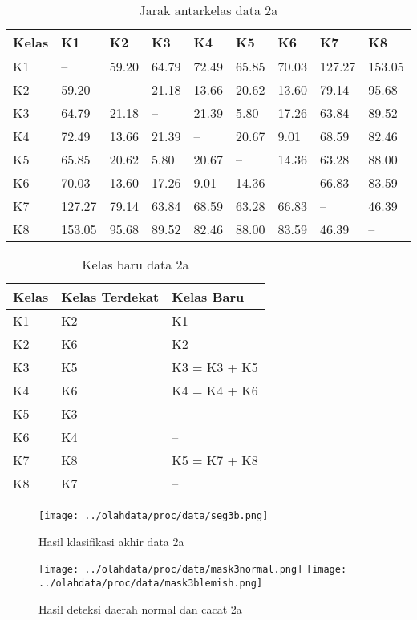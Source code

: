 \documentclass[laporan.tex]{subfiles}
\begin{document}
\begin{table}[h!]
\centering
\begin{tabular}{|l|l|l|l|l|l|l|l|l|}
\hline
Kelas & K1 & K2 & K3 & K4 & K5 & K6 & K7 & K8 \\
\hline
K1 & -- & 59.20 & 64.79 & 72.49 & 65.85 & 70.03 & 127.27 & 153.05 \\
K2 & 59.20 & -- & 21.18 & 13.66 & 20.62 & 13.60 & 79.14 & 95.68 \\
K3 & 64.79 & 21.18 & --	& 21.39 & 5.80 & 17.26 & 63.84 & 89.52 \\
K4 & 72.49 & 13.66 & 21.39 & --	& 20.67 & 9.01 & 68.59 & 82.46 \\
K5 & 65.85 & 20.62 & 5.80 & 20.67 & -- & 14.36 & 63.28 & 88.00 \\
K6 & 70.03 & 13.60 & 17.26 & 9.01 & 14.36 & -- & 66.83 & 83.59 \\
K7 & 127.27 & 79.14 & 63.84 & 68.59 & 63.28 & 66.83 & -- & 46.39 \\
K8 & 153.05 & 95.68 & 89.52 & 82.46 & 88.00 & 83.59 & 46.39 & -- \\
\hline
\end{tabular}
\caption[]{Jarak antarkelas data 2a}
\label{table:distyellow}
\end{table}

\begin{table}[h!]
\centering
\begin{tabular}{|l|l|l|}
\hline
Kelas & Kelas Terdekat & Kelas Baru \\
\hline
K1 & K2 & K1 \\
K2 & K6 & K2 \\
K3 & K5 & K3 = K3 + K5 \\
K4 & K6 & K4 = K4 + K6 \\
K5 & K3 & -- \\
K6 & K4 & -- \\
K7 & K8 & K5 = K7 + K8 \\
K8 & K7 & -- \\
\hline
\end{tabular}
\caption[]{Kelas baru data 2a}
\label{table:clsyellow2}
\end{table}

\begin{figure}[h!]
\centering
\texttt{[image: ../olahdata/proc/data/seg3b.png]}
\caption[]{Hasil klasifikasi akhir data 2a}
\end{figure}

\begin{figure}[h!]
\centering
\texttt{[image: ../olahdata/proc/data/mask3normal.png]} \qquad
\texttt{[image: ../olahdata/proc/data/mask3blemish.png]}
\caption[]{Hasil deteksi daerah normal dan cacat 2a}
\end{figure}
\end{document}
